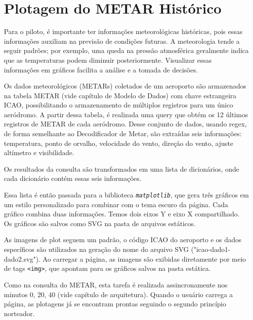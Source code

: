 \chapter{Plotagem do METAR Histórico}

Para o piloto, é importante ter informações meteorológicas históricas, pois 
essas informações auxiliam na previsão de condições futuras. A meteorologia tende 
a seguir padrões; por exemplo, uma queda na pressão atmosférica geralmente indica 
que as temperaturas podem diminuir posteriormente. Visualizar essas 
informações em gráficos facilita a análise e a tomada de decisões.

Os dados meteorológicos (METARs) coletados de um aeroporto são armazenados na tabela
METAR (vide capítulo de Modelo de Dados) com chave estrangeira ICAO, possibilitando
o armazenamento de múltiplos registros para um único aeródromo. A partir dessa 
tabela, é realizada uma query que obtém os 12 últimos registros 
de METAR de cada aeródromo. Desse conjunto de dados, usando regex, de forma
semelhante ao Decodificador de Metar, são extraídas seis informações: 
temperatura, ponto de orvalho, velocidade do vento, direção do vento, ajuste altímetro e visibilidade.

Os resultados da consulta são transformados em uma lista de dicionários, onde 
cada dicionário contém essas seis informações.




Essa lista é então passada para a biblioteca \texttt{\textit{matplotlib}}, que gera três 
gráficos em um estilo personalizado para combinar com o tema escuro da página. 
Cada gráfico combina duas informações. Temos dois eixos Y e eixo X compartilhado.
Os gráficos são salvos como SVG na pasta de arquivos estáticos.

As imagens de plot seguem um padrão, o código ICAO do aeroporto e os dados 
específicos são utilizados na geração do nome do arquivo SVG ("icao-dado1-dado2.svg"). 
Ao carregar a página, as imagens são exibidas diretamente por meio de tags \texttt{<img>},
 que apontam para os gráficos salvos na pasta estática.

Como na consulta do METAR, esta tarefa é realizada assincronamente nos 
minutos 0, 20, 40 (vide capítulo de arquitetura). Quando o usuário carrega a 
página, as plotagens já se encontram prontas seguindo o segundo princípio norteador.
